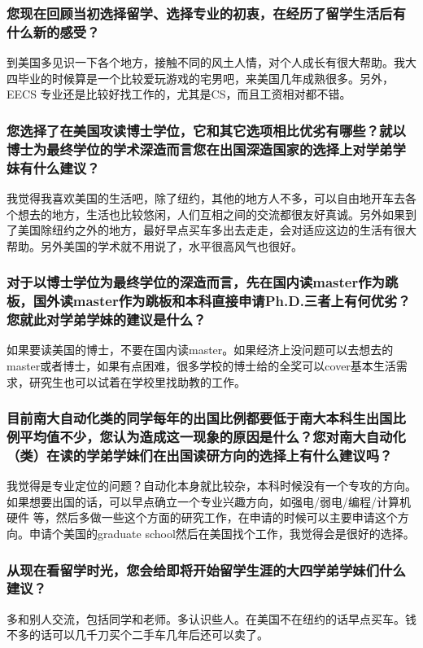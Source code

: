 \documentclass[a4paper,UTF8]{book}
\begin{document}
    \subsubsection*{您现在回顾当初选择留学、选择专业的初衷，在经历了留学生活后有什么新的感受？}
    到美国多见识一下各个地方，接触不同的风土人情，对个人成长有很大帮助。我大四毕业的时候算是一个比较爱玩游戏的宅男吧，来美国几年成熟很多。另外，EECS 专业还是比较好找工作的，尤其是CS，而且工资相对都不错。
    
    \subsubsection*{您选择了在美国攻读博士学位，它和其它选项相比优劣有哪些？就以博士为最终学位的学术深造而言您在出国深造国家的选择上对学弟学妹有什么建议？}
    我觉得我喜欢美国的生活吧，除了纽约，其他的地方人不多，可以自由地开车去各个想去的地方，生活也比较悠闲，人们互相之间的交流都很友好真诚。另外如果到了美国除纽约之外的地方，最好早点买车多出去走走，会对适应这边的生活有很大帮助。另外美国的学术就不用说了，水平很高风气也很好。
    
    \subsubsection*{对于以博士学位为最终学位的深造而言，先在国内读master作为跳板，国外读master作为跳板和本科直接申请Ph.D.三者上有何优劣？您就此对学弟学妹的建议是什么？}
    如果要读美国的博士，不要在国内读master。如果经济上没问题可以去想去的master或者博士，如果有点困难，很多学校的博士给的全奖可以cover基本生活需求，研究生也可以试着在学校里找助教的工作。
    
    \subsubsection*{目前南大自动化类的同学每年的出国比例都要低于南大本科生出国比例平均值不少，您认为造成这一现象的原因是什么？您对南大自动化（类）在读的学弟学妹们在出国读研方向的选择上有什么建议吗？}
    我觉得是专业定位的问题？自动化本身就比较杂，本科时候没有一个专攻的方向。如果想要出国的话，可以早点确立一个专业兴趣方向，如强电/弱电/编程/计算机硬件 等，然后多做一些这个方面的研究工作，在申请的时候可以主要申请这个方向。申请个美国的graduate school然后在美国找个工作，我觉得会是很好的选择。
    
    \subsubsection*{从现在看留学时光，您会给即将开始留学生涯的大四学弟学妹们什么建议？}
    多和别人交流，包括同学和老师。多认识些人。在美国不在纽约的话早点买车。钱不多的话可以几千刀买个二手车几年后还可以卖了。
\end{document}
